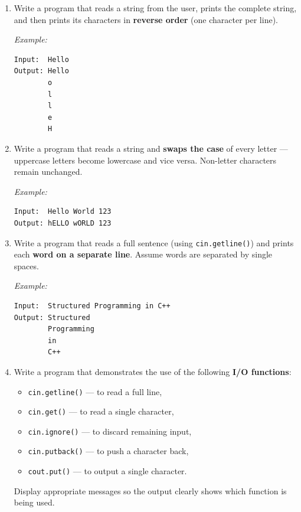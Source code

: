 \begin{enumerate}[leftmargin=*, label=\textbf{Q\arabic*.}]

\item Write a program that reads a string from the user, prints the
      complete string, and then prints its characters in
      \textbf{reverse order} (one character per line).

      \textit{Example:}
\begin{verbatim}
Input:  Hello
Output: Hello
        o
        l
        l
        e
        H
\end{verbatim}

\item Write a program that reads a string and \textbf{swaps the case}
      of every letter --- uppercase letters become lowercase and vice
      versa.  Non-letter characters remain unchanged.

      \textit{Example:}
\begin{verbatim}
Input:  Hello World 123
Output: hELLO wORLD 123
\end{verbatim}

\item Write a program that reads a full sentence (using
      \texttt{cin.getline()}) and prints each \textbf{word on a
      separate line}.  Assume words are separated by single spaces.

      \textit{Example:}
\begin{verbatim}
Input:  Structured Programming in C++
Output: Structured
        Programming
        in
        C++
\end{verbatim}

\item Write a program that demonstrates the use of the following
      \textbf{I/O functions}:
      \begin{itemize}
        \item \texttt{cin.getline()} --- to read a full line,
        \item \texttt{cin.get()} --- to read a single character,
        \item \texttt{cin.ignore()} --- to discard remaining input,
        \item \texttt{cin.putback()} --- to push a character back,
        \item \texttt{cout.put()} --- to output a single character.
      \end{itemize}
      Display appropriate messages so the output clearly shows which
      function is being used.


\end{enumerate}
